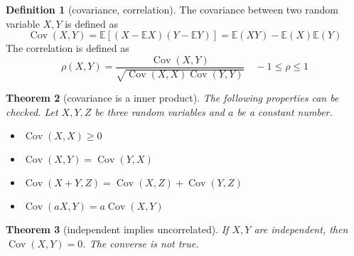 \documentclass{article}
\newtheorem{theorem}{Theorem}[section]
\theoremstyle{definition}
\newtheorem{definition}[theorem]{Definition}
\theoremstyle{remark}
\newcommand{\E}{\mathbb{E}}
\newcommand{\Cov}{\operatorname{Cov}}
\begin{document}
\begin{definition}[covariance, correlation]
	The covariance between two random variable \(X,Y\) is defined as
	\[
		\Cov(X,Y) = \E\left[(X-\E X)(Y-\E Y)\right] = \E(XY) - \E(X)\E(Y)
	\]
	The correlation is defined as
	\[
		\rho(X,Y) = \frac{\Cov(X,Y)}{\sqrt{\Cov(X,X)\Cov(Y,Y)}}
		\quad
		-1 \leq \rho \leq 1
	\]
\end{definition}
\begin{theorem}[covariance is a inner product]
	The following properties can be checked.
	Let \(X,Y,Z\) be three random variables and \(a\) be a constant number.
	\begin{itemize}
		\item \(\Cov(X,X) \geq 0\)
		\item \(\Cov(X,Y) = \Cov(Y,X)\)
		\item \(\Cov(X+Y,Z) = \Cov(X,Z) + \Cov(Y,Z)\)
		\item \(\Cov(aX,Y) = a \Cov(X,Y) \)
	\end{itemize}
\end{theorem}
\begin{theorem}[independent implies uncorrelated]
	If \(X,Y\) are independent, then \(\Cov(X,Y)=0\).
	The converse is not true.
\end{theorem}
\end{document}
